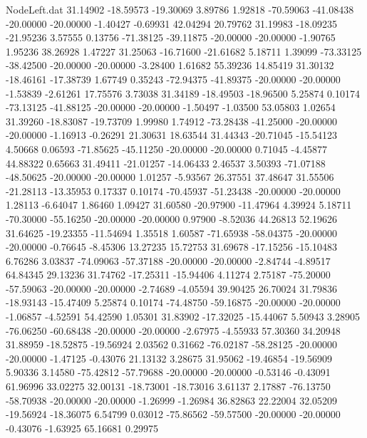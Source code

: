 \begin{filecontents}{NodeLeft.dat}
  31.14902  -18.59573  -19.30069     3.89786    1.92818  -70.59063  -41.08438  -20.00000  -20.00000   -1.40427   -0.69931   42.04294   20.79762
  31.19983  -18.09235  -21.95236     3.57555    0.13756  -71.38125  -39.11875  -20.00000  -20.00000   -1.90765    1.95236   38.26928    1.47227
  31.25063  -16.71600  -21.61682     5.18711    1.39099  -73.33125  -38.42500  -20.00000  -20.00000   -3.28400    1.61682   55.39236   14.85419
  31.30132  -18.46161  -17.38739     1.67749    0.35243  -72.94375  -41.89375  -20.00000  -20.00000   -1.53839   -2.61261   17.75576    3.73038
  31.34189  -18.49503  -18.96500     5.25874    0.10174  -73.13125  -41.88125  -20.00000  -20.00000   -1.50497   -1.03500   53.05803    1.02654
  31.39260  -18.83087  -19.73709     1.99980    1.74912  -73.28438  -41.25000  -20.00000  -20.00000   -1.16913   -0.26291   21.30631   18.63544
  31.44343  -20.71045  -15.54123     4.50668    0.06593  -71.85625  -45.11250  -20.00000  -20.00000    0.71045   -4.45877   44.88322    0.65663
  31.49411  -21.01257  -14.06433     2.46537    3.50393  -71.07188  -48.50625  -20.00000  -20.00000    1.01257   -5.93567   26.37551   37.48647
  31.55506  -21.28113  -13.35953     0.17337    0.10174  -70.45937  -51.23438  -20.00000  -20.00000    1.28113   -6.64047    1.86460    1.09427
  31.60580  -20.97900  -11.47964     4.39924    5.18711  -70.30000  -55.16250  -20.00000  -20.00000    0.97900   -8.52036   44.26813   52.19626
  31.64625  -19.23355  -11.54694     1.35518    1.60587  -71.65938  -58.04375  -20.00000  -20.00000   -0.76645   -8.45306   13.27235   15.72753
  31.69678  -17.15256  -15.10483     6.76286    3.03837  -74.09063  -57.37188  -20.00000  -20.00000   -2.84744   -4.89517   64.84345   29.13236
  31.74762  -17.25311  -15.94406     4.11274    2.75187  -75.20000  -57.59063  -20.00000  -20.00000   -2.74689   -4.05594   39.90425   26.70024
  31.79836  -18.93143  -15.47409     5.25874    0.10174  -74.48750  -59.16875  -20.00000  -20.00000   -1.06857   -4.52591   54.42590    1.05301
  31.83902  -17.32025  -15.44067     5.50943    3.28905  -76.06250  -60.68438  -20.00000  -20.00000   -2.67975   -4.55933   57.30360   34.20948
  31.88959  -18.52875  -19.56924     2.03562    0.31662  -76.02187  -58.28125  -20.00000  -20.00000   -1.47125   -0.43076   21.13132    3.28675
  31.95062  -19.46854  -19.56909     5.90336    3.14580  -75.42812  -57.79688  -20.00000  -20.00000   -0.53146   -0.43091   61.96996   33.02275
  32.00131  -18.73001  -18.73016     3.61137    2.17887  -76.13750  -58.70938  -20.00000  -20.00000   -1.26999   -1.26984   36.82863   22.22004
  32.05209  -19.56924  -18.36075     6.54799    0.03012  -75.86562  -59.57500  -20.00000  -20.00000   -0.43076   -1.63925   65.16681    0.29975

\end{filecontents}

